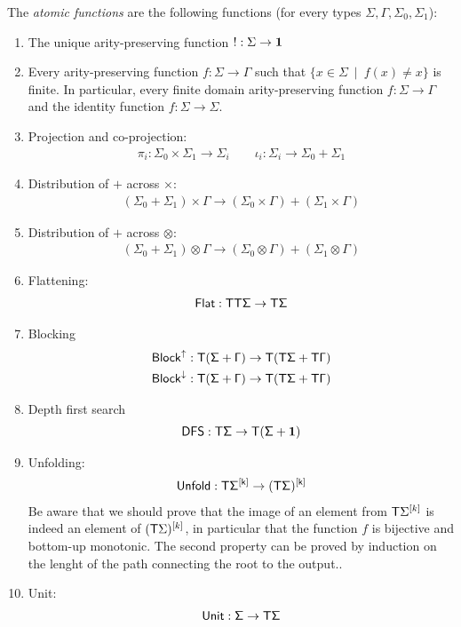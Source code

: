 \begin{definition}\label{def:atomic-functions} The \emph{atomic functions} are the following functions (for every types $\Sigma,\Gamma,\Sigma_0,\Sigma_1$): 
\begin{enumerate}
    \item The unique arity-preserving function $! : \Sigma \to \mathbf{1}$
    \item Every arity-preserving function $f : \Sigma \to \Gamma$ such that    $\{x \in \Sigma \ \mid \ f(x)\neq x\}$ is finite. In particular, every finite domain arity-preserving function $f : \Sigma \to \Gamma$ and the identity function $f : \Sigma \to \Sigma$.
    \item Projection and co-projection:
    \begin{align*}
        \pi_i : \Sigma_0 \times \Sigma_1 \to \Sigma_i \qquad \iota_i : \Sigma_i \to \Sigma_0 + \Sigma_1
    \end{align*}
    \item Distribution of $+$ across $\times$:
\begin{align*}
    (\Sigma_0 + \Sigma_1 ) \times \Gamma \to (\Sigma_0 \times \Gamma) + (\Sigma_1 \times \Gamma)
\end{align*}
\item Distribution of $+$ across $\otimes$:
\begin{align*}
    (\Sigma_0 + \Sigma_1 ) \otimes \Gamma \to (\Sigma_0 \otimes \Gamma) + (\Sigma_1 \otimes \Gamma)
\end{align*}
\item Flattening:
\begin{align*}
    \sf{Flat}: \mathsf T \mathsf T \Sigma \to \mathsf T \Sigma
\end{align*}
\item Blocking
    \begin{align*}
        \sf{Block}^{\uparrow}:\mathsf T (\Sigma + \Gamma) \to \mathsf T (\mathsf T \Sigma + \mathsf T \Gamma)\\
        \sf{Block}^{\downarrow}:\mathsf T (\Sigma + \Gamma) \to \mathsf T (\mathsf T \Sigma + \mathsf T \Gamma)
    \end{align*}
    \item Depth first search
    \begin{align*}
        \sf{DFS}:\mathsf T \Sigma \to \mathsf T (\Sigma+\mathbf{1})
    \end{align*}
    \item Unfolding: 
\begin{align*}
    \sf{Unfold}:\mathsf T \Sigma^{[k]} \to (\mathsf T \Sigma)^{[k]}
\end{align*}
Be aware that we should prove that the image of an element from $\mathsf T \Sigma^{[k]}$ is indeed an element of $(\mathsf T \Sigma)^{[k]}$, in particular that the function $f$ is bijective and bottom-up monotonic. The second property can be proved by induction on the lenght of the path connecting the root to the output..
    \item Unit:
\begin{align*}
    \sf{Unit}:\Sigma  \to \mathsf T \Sigma
\end{align*}


\end{enumerate}
\end{definition}
